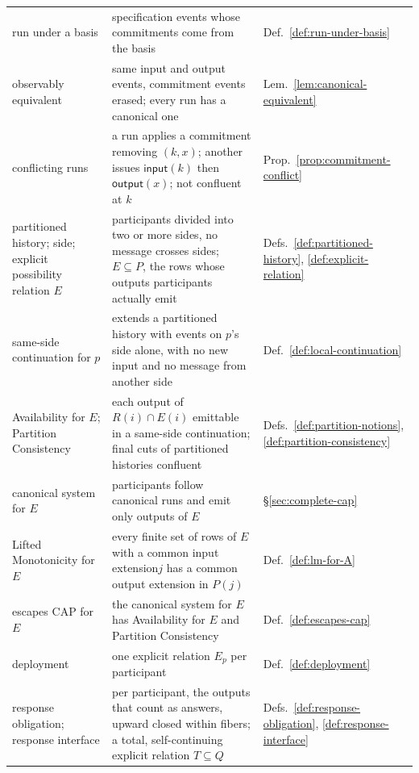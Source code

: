 \documentclass[sigconf]{cidr-2027}
\theoremstyle{remark}
\newcommand{\commitment}{commitment\xspace}
\newcommand{\commitments}{commitments\xspace}
\newcommand{\indesc}{input extension\xspace} %
\newcommand{\outnoun}{output extension\xspace}%
\newcommand{\fiber}[1]{P(#1)}
\begin{document}
{\begin{tabular}{@{}p{}p{}p{}@{}}
  run under a basis & specification events whose \commitments come from the basis & Def.~\ref{def:run-under-basis}\\
  observably equivalent & same input and output events, \commitment events erased; every run has a canonical one & Lem.~\ref{lem:canonical-equivalent}\\
  conflicting runs & a run applies a \commitment removing $(k,x)$; another issues $\mathsf{input}(k)$ then $\mathsf{output}(x)$; not confluent at $k$ & Prop.~\ref{prop:commitment-conflict}\\
  partitioned history; side; explicit possibility relation $E$ & participants divided into two or more sides, no message crosses sides; $E\subseteq P$, the rows whose outputs participants actually emit & Defs.~\ref{def:partitioned-history}, \ref{def:explicit-relation}\\
  same-side continuation for $p$ & extends a partitioned history with events on $p$'s side alone, with no new input and no message from another side & Def.~\ref{def:local-continuation}\\
  Availability for $E$; Partition Consistency & each output of $R(i)\cap E(i)$ emittable in a same-side continuation; final cuts of partitioned histories confluent & Defs.~\ref{def:partition-notions}, \ref{def:partition-consistency}\\
  canonical system for $E$ & participants follow canonical runs and emit only outputs of $E$ & \S\ref{sec:complete-cap}\\
  Lifted Monotonicity for $E$ & every finite set of rows of $E$ with a common \indesc $j$ has a common \outnoun in $\fiber{j}$ & Def.~\ref{def:lm-for-A}\\
  escapes CAP for $E$ & the canonical system for $E$ has Availability for $E$ and Partition Consistency & Def.~\ref{def:escapes-cap}\\
  deployment & one explicit relation $E_p$ per participant & Def.~\ref{def:deployment}\\
    response obligation; response interface & per participant, the outputs that count as answers, upward closed within fibers; a total, self-continuing explicit relation $T\subseteq Q$ & Defs.~\ref{def:response-obligation}, \ref{def:response-interface}\\
  \bottomrule
\end{tabular}

}
\end{document}
